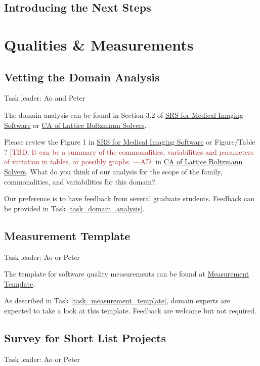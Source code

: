 \documentclass[12pt]{article}
\newcommand{\authornote}[3]{\textcolor{#1}{[#3 ---#2]}}
\newcommand{\authornote}[3]{}
\newcommand{\ad}[1]{\authornote{brown}{AD}{#1}} %
\begin{document}
\subsection{Introducing the Next Steps}

\section{Qualities \& Measurements}
\label{qualities_measurements}

\subsection{Vetting the Domain Analysis}
\label{domain_analysis}
Task leader: Ao and Peter

The domain analysis can be found in Section 3.2 of
\href{https://github.com/Ao99/MISEG/blob/master/docs/SRS/SRS.pdf}{SRS for
Medical Imaging Software} or
\href{https://github.com/peter-michalski/LatticeBoltzmannSolvers/blob/master/docs/SRS/CA.pdf}{CA
of Lattice Boltzmann Solvers}.

Please review the Figure 1 in \href{https://github.com/Ao99/MISEG/blob/master/docs/SRS/SRS.pdf}{SRS for
Medical Imaging Software} or Figure/Table ? \ad{TBD. It can be a summary of the
commonalities, variabilities and parameters of variation in tables, or possibly
graphs.} in
\href{https://github.com/peter-michalski/LatticeBoltzmannSolvers/blob/master/docs/SRS/CA.pdf}{CA
of Lattice Boltzmann Solvers}.
What do you think of our analysis for the scope of the family, commonalities, and variabilities  for this domain?

Our preference is to have feedback from several graduate students. Feedback can be provided in Task \ref{task_domain_analysis}.

\subsection{Measurement Template}
\label{measurement_template}
Task leader: Ao or Peter

The template for software quality measurements can be found at
\href{https://github.com/smiths/AIMSS/blob/master/StateOfPractice/Combined_MeasurementTemplate_EmpiricalMeasures.xlsx}{Measurement
	Template}.

As described in Task \ref{task_measurement_template}, domain experts are
expected to take a look at this template. Feedback are welcome but not required.

\subsection{Survey for Short List Projects}
\label{survey_short_list_projects}
Task leader: Ao or Peter
\end{document}
